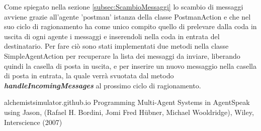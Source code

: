 \documentclass[12pt,a4paper,openright,twoside]{report}
\begin{document}
\bigskip

Come spiegato nella sezione \ref{subsec:ScambioMessaggi} lo scambio di messaggi avviene grazie all'agente 'postman' istanza della classe PostmanAction e che nel suo ciclo di ragionamento ha come unico compito quello di prelevare dalla coda in uscita di ogni agente i messaggi e inserendoli nella coda in entrata del destinatario. Per fare ci\`o sono stati implementati due metodi nella classe SimpleAgentAction per recuperare la lista dei messaggi da inviare, liberando quindi la casella di posta in uscita, e per inserire un nuovo messaggio nella casella di posta in entrata, la quale verr\`a svuotata dal metodo \textbf{\textit{handleIncomingMessages}} al prossimo ciclo di ragionamento.




\begin{thebibliography}{90} %
\rhead[\fancyplain{}{\bfseries \leftmark}]{\fancyplain{}{\bfseries \thepage}}

 alchemistsimulator.github.io
 Programming Multi-Agent Systems in AgentSpeak using Jason, (Rafael H. Bordini, Jomi Fred H\"{u}bner, Michael Wooldridge), Wiley, Interscience (2007)

\end{thebibliography}
\end{document}
